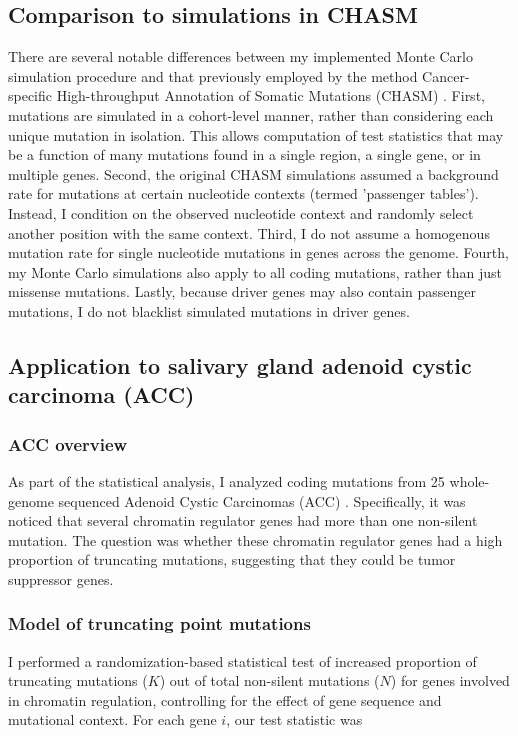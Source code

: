 \subsection{Comparison to simulations in CHASM}

There are several notable differences between my implemented Monte Carlo simulation procedure and that previously employed by the method Cancer-specific High-throughput Annotation of Somatic Mutations (CHASM) \cite{RN29}. First, mutations are simulated in a cohort-level manner, rather than considering each unique mutation in isolation. This allows computation of test statistics that may be a function of many mutations found in a single region, a single gene, or in multiple genes. Second, the original CHASM simulations assumed a background rate for mutations at certain nucleotide contexts (termed 'passenger tables'). Instead, I condition on the observed nucleotide context and randomly select another position with the same context. Third, I do not assume a homogenous mutation rate for single nucleotide mutations in genes across the genome. Fourth, my Monte Carlo simulations also apply to all coding mutations, rather than just missense mutations. Lastly, because driver genes may also contain passenger mutations, I do not blacklist simulated mutations in driver genes.

\subsection{Application to salivary gland adenoid cystic carcinoma (ACC)}

\subsubsection{ACC overview}

As part of the statistical analysis, I analyzed coding mutations from 25 whole-genome sequenced Adenoid Cystic Carcinomas (ACC) \cite{RN76}. Specifically, it was noticed that several chromatin regulator genes had more than one non-silent mutation. The question was whether these chromatin regulator genes had a high proportion of truncating mutations, suggesting that they could be tumor suppressor genes.

\subsubsection{Model of truncating point mutations}

I performed a randomization-based statistical test of increased proportion of truncating mutations ($K$) out of total non-silent mutations ($N$) for genes involved in chromatin regulation, controlling for the effect of gene sequence and mutational context. For each gene $i$, our test statistic was

